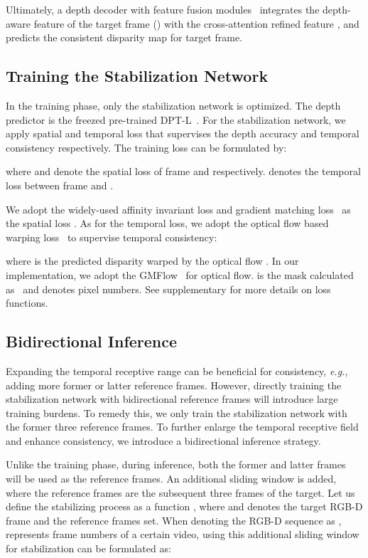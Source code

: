 \documentclass[10pt,twocolumn,letterpaper]{article}
\def\SbN{Stabilization Network}
\def\sbn{stabilization network}
\begin{document}
Ultimately, a depth decoder with feature fusion modules~\cite{FFM1,FFM2} integrates the depth-aware feature of the target frame () with the cross-attention refined feature , and predicts the consistent disparity map for target frame. 







\subsection{Training the \SbN{}}
In the training phase, only the \sbn{} is optimized. The depth predictor is the freezed pre-trained DPT-L~\cite{dpt}. For the \sbn{}, we apply spatial and temporal loss that supervises the depth accuracy and temporal consistency respectively. The training loss can be formulated by:

where  and  denote the spatial loss of frame  and  respectively.  denotes the temporal loss between frame  and .

We adopt the widely-used affinity invariant loss and gradient matching loss~\cite{midas,dpt} as the spatial loss . As for the temporal loss, we adopt the optical flow based warping loss~\cite{MM21,fmnet} to supervise temporal consistency:

where  is the predicted disparity  warped by the optical flow . In our implementation, we adopt the GMFlow~\cite{gmflow} for optical flow.  is the mask calculated as~\cite{MM21,fmnet} and  denotes pixel numbers. See supplementary for more details on loss functions. 


\subsection{Bidirectional Inference}
\label{sec:biinfer}
Expanding the temporal receptive range can be beneficial for consistency, \textit{e.g.}, adding more former or latter reference frames. However, directly training the \sbn{} with bidirectional reference frames will introduce large training burdens. To remedy this, we only train the \sbn{} with the former three reference frames. To further enlarge the temporal receptive field and enhance consistency, we introduce a bidirectional inference strategy.


Unlike the training phase, during inference, both the former and latter frames will be used as the reference frames. An additional sliding window is added, where the reference frames are the subsequent three frames of the target.
Let us define the stabilizing process as a function , where  and  denotes the target RGB-D frame and the reference frames set. When denoting the RGB-D sequence as ,  represents frame numbers of a certain video, using this additional sliding window for stabilization can be formulated as:
\end{document}

